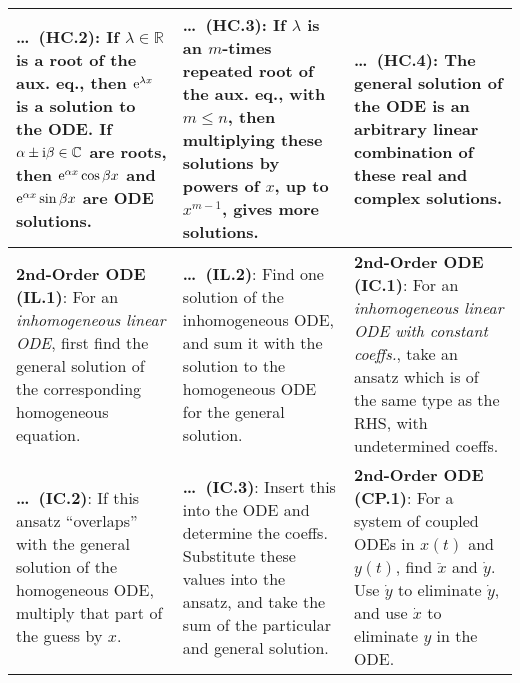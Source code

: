 \begin{tabular}{|m{.31\linewidth}|m{.31\linewidth}|m{.31\linewidth}|}
\hline

\textbf{\ldots\ (HC.2)}: If $\lambda\in\mathbb{R}$ is a root of the aux.  eq.,
then $\mathrm{e}^{\lambda x}$ is a solution to the ODE.  If
$\alpha\pm\mathrm{i}\beta\in\mathbb{C}$ are roots, then
$\mathrm{e}^{\alpha x}\cos\beta x$ and $\mathrm{e}^{\alpha x}\sin\beta x$
are ODE solutions. &

\textbf{\ldots\ (HC.3)}: If $\lambda$ is an $m$-times repeated root of the aux.
eq., with $m\leq n$, then multiplying these solutions by powers of $x$, up to
$x^{m-1}$, gives more solutions. &

\textbf{\ldots\ (HC.4)}: The general solution of the ODE is an arbitrary linear
combination of these real and complex solutions. \\

\hline

\textbf{2nd-Order ODE (IL.1)}: For an \emph{inhomogeneous linear ODE}, first
find the general solution of the corresponding homogeneous equation. &

\textbf{\ldots\ (IL.2)}: Find one solution of the inhomogeneous ODE, and
sum it with the solution to the homogeneous ODE for the general solution. &

\textbf{2nd-Order ODE (IC.1)}: For an \emph{inhomogeneous linear ODE with
constant coeffs.}, take an ansatz which is of the same type as the RHS, with
undetermined coeffs. \\

\hline

\textbf{\ldots\ (IC.2)}: If this ansatz ``overlaps'' with the general
solution of the homogeneous ODE, multiply that part of the guess by $x$. &

\textbf{\ldots\ (IC.3)}: Insert this into the ODE and determine the coeffs.
Substitute these values into the ansatz, and take the sum of the particular and
general solution. &

\textbf{2nd-Order ODE (CP.1)}: For a system of coupled ODEs in $x(t)$ and
$y(t)$, find $\ddot{x}$ and $\dot{y}$. Use $\dot{y}$ to eliminate $\dot{y}$, and
use $\dot{x}$ to eliminate $y$ in the ODE. \\

\hline
\end{tabular}
\clearpage

%
%

